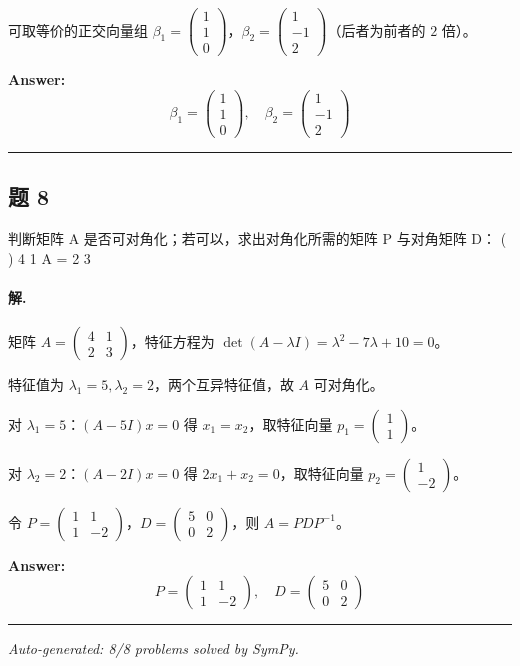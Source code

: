 \documentclass[12pt, a4paper]{article}
\newcommand{\problem}[1]{\subsection*{题 #1}}
\newcommand{\solution}{\paragraph{解.}}
\begin{document}
可取等价的正交向量组 $\beta_1=\begin{pmatrix}1\\1\\0\end{pmatrix}$，$\beta_2=\begin{pmatrix}1\\-1\\2\end{pmatrix}$（后者为前者的 $2$ 倍）。

\textbf{Answer:}
\[\boxed{\beta_1=\begin{pmatrix}1\\1\\0\end{pmatrix},\quad \beta_2=\begin{pmatrix}1\\-1\\2\end{pmatrix}}\]

\vspace{1em}
\hrule
\vspace{1em}

\problem{8}

判断矩阵 A 是否可对角化；若可以，求出对角化所需的矩阵 P 与对角矩阵 D：
( )
4 1
A =
2 3

\solution

矩阵 $A=\begin{pmatrix}4&1\\2&3\end{pmatrix}$，特征方程为 $\det(A-\lambda I)=\lambda^2-7\lambda+10=0$。

特征值为 $\lambda_1=5,\lambda_2=2$，两个互异特征值，故 $A$ 可对角化。

对 $\lambda_1=5$：$(A-5I)x=0$ 得 $x_1=x_2$，取特征向量 $p_1=\begin{pmatrix}1\\1\end{pmatrix}$。

对 $\lambda_2=2$：$(A-2I)x=0$ 得 $2x_1+x_2=0$，取特征向量 $p_2=\begin{pmatrix}1\\-2\end{pmatrix}$。

令 $P=\begin{pmatrix}1&1\\1&-2\end{pmatrix}$，$D=\begin{pmatrix}5&0\\0&2\end{pmatrix}$，则 $A=PDP^{-1}$。

\textbf{Answer:}
\[\boxed{P=\begin{pmatrix}1&1\\1&-2\end{pmatrix},\quad D=\begin{pmatrix}5&0\\0&2\end{pmatrix}}\]

\vspace{1em}
\hrule
\vspace{1em}


\vspace{2em}
\noindent\textit{Auto-generated: 8/8 problems solved by SymPy.}
\end{document}

